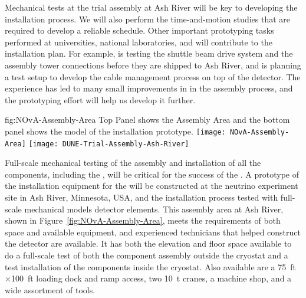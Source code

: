 Mechanical tests at the  trial assembly at Ash River will be key to developing the installation process. We will also perform the time-and-motion studies that are required to develop a reliable schedule.  Other important prototyping tasks performed at  universities, national laboratories, and  will contribute to the installation plan. 
For example,  is testing the  shuttle beam drive system and the  assembly tower connections before they are shipped to Ash River, and  is planning a test setup to develop the cable management process on top of the detector. 
The  experience has led to many small improvements in 
in the assembly process, and the  prototyping effort will help us develop it further. 


\begin{dunefigure}
{fig:NOvA-Assembly-Area}
{Top Panel shows the  Assembly Area and the bottom panel shows the \threed model of the installation prototype.}                
\texttt{[image: NOvA-Assembly-Area]}
\vspace{-12pt}
\texttt{[image: DUNE-Trial-Assembly-Ash-River]}
\end{dunefigure}

Full-scale mechanical testing of the assembly and installation of all the  components, including the , will be critical for the success of the . 
A prototype of the installation equipment for the   will be constructed at the  neutrino experiment  site in Ash River, Minnesota, USA, and the installation process tested with full-scale mechanical models detector elements.  
This assembly area at Ash River, shown in Figure~\ref{fig:NOvA-Assembly-Area}, meets the requirements of both space and available equipment, and experienced technicians that helped construct the  detector are available. 
It has both the elevation and floor space available to do a full-scale test of both the component assembly outside the cryostat and a test installation of the  components  inside the
cryostat. 
Also available are a \SI{75}{ft}$\times$\SI{100}{ft} loading dock and ramp access, two \SI{10}{t} cranes, a machine shop, and a wide assortment of tools. 


